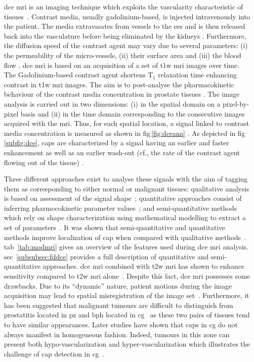\ac{dce} \ac{mri} is an imaging technique which exploits the vascularity characteristic of tissues~\cite{Verma2012}. Contrast media, usually gadolinium-based, is injected intravenously into the patient. The media extravasates from vessels to the \ac{ees} and is then released back into the vasculature before being eliminated by the kidneys \cite{Gribbestad2005}. Furthermore, the diffusion speed of the contrast agent may vary due to several parameters: (i) the permeability of the micro-vessels, (ii) their surface area and (iii) the blood flow \cite{Padhani2002}. \ac{dce} \ac{mri} is based on an acquisition of a set of \ac{t1w} \ac{mri} images over time. The Gadolinium-based contrast agent shortens T$_1$ relaxation time enhancing contrast in \ac{t1w} \ac{mri} images. The aim is to post-analyse the pharmacokinetic behaviour of the contrast media concentration in prostate tissues \cite{Verma2012}. The image analysis is carried out in two dimensions: (i) in the spatial domain on a pixel-by-pixel basis and (ii) in the time domain corresponding to the consecutive images acquired with the \ac{mri}. Thus, for each spatial location, a signal linked to contrast media concentration is measured as shown in \acs{fig}\,\ref{fig:dceana} \cite{Tofts2010}. As depicted in \acs{fig}\,\ref{subfig:dce}, \acp{cap} are characterized by a signal having an earlier and faster enhancement as well as an earlier wash-out (cf., the rate of the contrast agent flowing out of the tissue) \cite{Verma2012}.

Three different approaches exist to analyse these signals with the aim of tagging them as corresponding to either normal or malignant tissues: qualitative analysis is based on assessment of the signal shape~\cite{Hoeks2011}; quantitative approaches consist of inferring pharmocokinetic parameter values~\cite{Tofts2010}; and semi-quantitative methods which rely on shape characterization using mathematical modelling to extract a set of parameters~\cite{Hoeks2011,Verma2012}. It was shown that semi-quantitative and quantitative methods improve localization of \ac{cap} when compared with qualitative methods~\cite{Rosenkrantz2013}. \Acl{tab}~\ref{tab:modmri} gives an overview of the features used during \ac{dce} \ac{mri} analysis. \Acl{sec}~\ref{subsubsec:fddce} provides a full description of quantitative and semi-quantitative approaches. \ac{dce} \ac{mri} combined with \ac{t2w} \ac{mri} has shown to enhance sensitivity compared to \ac{t2w} \ac{mri} alone~\cite{Jager1997,Kim2005,Schlemmer2004,Zelhof2009}. Despite this fact, \ac{dce} \ac{mri} possesses some drawbacks. Due to its ``dynamic'' nature, patient motions during the image acquisition may lead to spatial misregistration of the image set~\cite{Verma2012}. Furthermore, it has been suggested that malignant tumours are difficult to distinguish from prostatitis located in \ac{pz} and \ac{bph} located in \ac{cg}~\cite{Hoeks2011,Verma2012} as these two pairs of tissues tend to have similar appearances. Later studies have shown that \acp{cap} in \ac{cg} do not always manifest in homogeneous fashion. Indeed, tumours in this zone can present both hypo-vascularization and hyper-vascularization which illustrates the challenge of \ac{cap} detection in \ac{cg}~\cite{Niekerk2013}.


